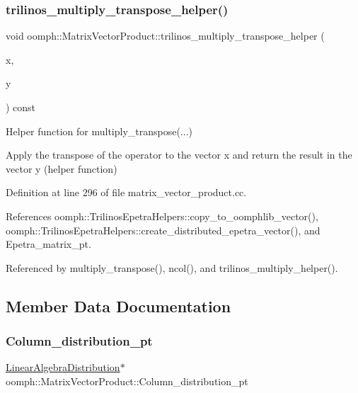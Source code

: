 \subsubsection{\texorpdfstring{trilinos\+\_\+multiply\+\_\+transpose\+\_\+helper()}{trilinos\_multiply\_transpose\_helper()}}
{\footnotesize\ttfamily void oomph\+::\+Matrix\+Vector\+Product\+::trilinos\+\_\+multiply\+\_\+transpose\+\_\+helper (\begin{DoxyParamCaption}\item[{const \hyperlink{classoomph_1_1DoubleVector}{Double\+Vector} \&}]{x,  }\item[{\hyperlink{classoomph_1_1DoubleVector}{Double\+Vector} \&}]{y }\end{DoxyParamCaption}) const\hspace{0.3cm}{\ttfamily [private]}}



Helper function for multiply\+\_\+transpose(...) 

Apply the transpose of the operator to the vector x and return the result in the vector y (helper function) 

Definition at line 296 of file matrix\+\_\+vector\+\_\+product.\+cc.



References oomph\+::\+Trilinos\+Epetra\+Helpers\+::copy\+\_\+to\+\_\+oomphlib\+\_\+vector(), oomph\+::\+Trilinos\+Epetra\+Helpers\+::create\+\_\+distributed\+\_\+epetra\+\_\+vector(), and Epetra\+\_\+matrix\+\_\+pt.



Referenced by multiply\+\_\+transpose(), ncol(), and trilinos\+\_\+multiply\+\_\+helper().



\subsection{Member Data Documentation}
\mbox{\label{classoomph_1_1MatrixVectorProduct_a986b1f7596b96329644f082b3303e28a}} 
\subsubsection{\texorpdfstring{Column\+\_\+distribution\+\_\+pt}{Column\_distribution\_pt}}
{\footnotesize\ttfamily \hyperlink{classoomph_1_1LinearAlgebraDistribution}{Linear\+Algebra\+Distribution}$\ast$ oomph\+::\+Matrix\+Vector\+Product\+::\+Column\+\_\+distribution\+\_\+pt\hspace{0.3cm}{\ttfamily [private]}}




